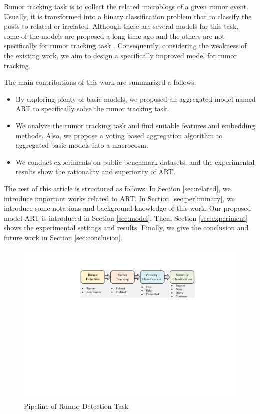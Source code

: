Rumor tracking task is to collect the related microblogs of a given rumor event. Usually, it is transformed into a binary classification problem that to classify the posts to related or irrelated. Although there are several models for this task, some of the models are proposed a long time ago \cite{DBLP:conf/emnlp/QazvinianRRM11} and the others are not specifically for rumor tracking task \cite{DBLP:conf/www/ChengNB20}.
Consequently, considering the weakness of the existing work, we aim to design a specifically improved model for rumor tracking. 

The main contributions of this work are summarized a follows:
\begin{itemize}
	\item By exploring plenty of basic models, we proposed an aggregated model named ART to specifically solve the rumor tracking task. 
	\item We analyze the rumor tracking task and find suitable features and embedding methods. Also, we propose a voting based aggregation algorithm to aggregated basic models into a macrocosm.
	\item We conduct experiments on public benchmark datasets, and the experimental results show the rationality and superiority of ART.
\end{itemize}

The rest of this article is structured as follows. In Section \ref{sec:related}, we introduce important works related to ART. In Section \ref{sec:perliminary}, we introduce some notations and background knowledge of this work. Our proposed model ART is introduced in Section \ref{sec:model}. Then, Section \ref{sec:experiment} shows the experimental settings and results. Finally, we give the conclusion and future work in Section \ref{sec:conclusion}.

\begin{figure}[tbp]
	\hspace{0ex}
	\vspace{0ex}
	\centering
	\includegraphics[width = \textwidth]{fig/pipeline}
	\caption{Pipeline of Rumor Detection Task}
	\label{fig:pipeline}
\end{figure}